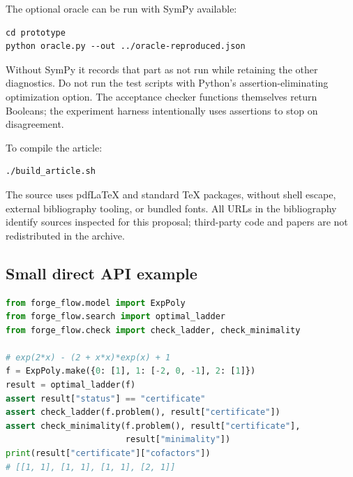 The optional oracle can be run with SymPy available:
\par\noindent\begin{minipage}{\textwidth}
\begin{lstlisting}
cd prototype
python oracle.py --out ../oracle-reproduced.json
\end{lstlisting}
\end{minipage}\par
Without SymPy it records that part as not run while retaining the other diagnostics. Do not run the test scripts with Python's assertion-eliminating optimization option. The acceptance checker functions themselves return Booleans; the experiment harness intentionally uses assertions to stop on disagreement.

To compile the article:
\par\noindent\begin{minipage}{\textwidth}
\begin{lstlisting}
./build_article.sh
\end{lstlisting}
\end{minipage}\par
The source uses pdfLaTeX and standard TeX packages, without shell escape, external bibliography tooling, or bundled fonts. All URLs in the bibliography identify sources inspected for this proposal; third-party code and papers are not redistributed in the archive.

\subsection{Small direct API example}

\par\noindent\begin{minipage}{\textwidth}
\begin{lstlisting}[language=Python]
from forge_flow.model import ExpPoly
from forge_flow.search import optimal_ladder
from forge_flow.check import check_ladder, check_minimality

# exp(2*x) - (2 + x*x)*exp(x) + 1
f = ExpPoly.make({0: [1], 1: [-2, 0, -1], 2: [1]})
result = optimal_ladder(f)
assert result["status"] == "certificate"
assert check_ladder(f.problem(), result["certificate"])
assert check_minimality(f.problem(), result["certificate"],
                        result["minimality"])
print(result["certificate"]["cofactors"])
# [[1, 1], [1, 1], [1, 1], [2, 1]]
\end{lstlisting}
\end{minipage}\par

